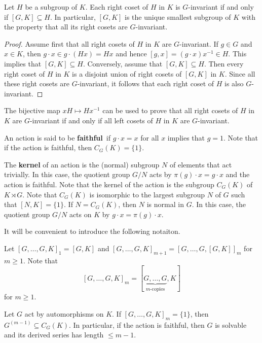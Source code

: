 \begin{proposition}
Let $H$ be a subgroup of $K$. Each right coset of $H$ in $K$ is $G$-invariant if and only if 
$[G,K]\subseteq H$. In particular, $[G,K]$ is the unique smallest subgroup of $K$ with the 
property that all its right cosets are $G$-invariant. 	
\end{proposition}

\begin{proof}
	Assume first that all right cosets of $H$ in $K$ are $G$-invariant. If $g\in G$ and $x\in K$, then
	$g\cdot x\in g\cdot (Hx)=Hx$ and hence $[g,x]=(g\cdot x)x^{-1}\in H$. This implies that $[G,K]\subseteq H$. 
	Conversely, assume that $[G,K]\subseteq H$. Then every right coset of $H$ in $K$ 
	is a disjoint union of right cosets of $[G,K]$ in $K$. 
	Since all these right cosets are $G$-invariant, it follows
	that each right coset of $H$ is also $G$-invariant. 	 
\end{proof}

The bijective map $xH\mapsto Hx^{-1}$ can be used to prove that all right cosets 
of $H$ in $K$ are $G$-invariant if and only if all left cosets of $H$ in $K$ are $G$-invariant. 

An action is said to be \textbf{faithful} if $g\cdot x=x$ for all $x$ implies that $g=1$. 
Note that if the action is faithful, then $C_G(K)=\{1\}$. 

The \textbf{kernel}
of an action is the (normal) subgroup $N$ of elements that act trivially. In this case, the quotient group
$G/N$ acts by $\pi(g)\cdot x=g\cdot x$ and the action is faithful. Note that
the kernel of the action 
is the subgroup $C_G(K)$ of $K\rtimes G$. Note that $C_G(K)$ is isomorphic to 
the largest subgroup $N$ of $G$ such that $[N,K]=\{1\}$. If $N=C_G(K)$, then $N$ is normal in $G$. In this case,
the quotient group $G/N$ acts on $K$ by $g\cdot x=\pi(g)\cdot x$. 

It will be convenient to introduce the following notaiton. 

Let 
$[G,\dots,G,K]_1 = [G,K]$ and $[G,\dots,G,K]_{m+1}=[G,\dots,G,[G,K]]_m$ for $m\geq 1$. Note that 
\[
[G,\dots,G,K]_{m}=[\underbrace{G,\dots,G}_{\text{$m$-copies}},K]
\] 
for $m\geq 1$.

\begin{theorem}
Let $G$ act by automorphisms on $K$. If $[G,\dots,G,K]_m=\{1\}$, then
$G^{(m-1)}\subseteq  C_G(K)$. In particular, if the action is faithful, 
then $G$ is solvable 
and its derived series has length $\leq m-1$.
\end{theorem}

